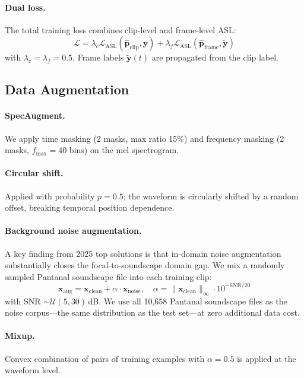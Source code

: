 \documentclass[10pt,twocolumn]{article}
\newcommand{\vx}{\mathbf{x}}
\begin{document}
\paragraph{Dual loss.}
The total training loss combines clip-level and frame-level ASL:
\begin{equation}
  \mathcal{L} = \lambda_c \mathcal{L}_\text{ASL}(\hat{\bm{p}}_\text{clip}, \bm{y})
              + \lambda_f \mathcal{L}_\text{ASL}(\hat{\bm{p}}_\text{frame}, \tilde{\bm{y}})
  \label{eq:dual}
\end{equation}
with $\lambda_c = \lambda_f = 0.5$.
Frame labels $\tilde{\bm{y}}(t)$ are propagated from the clip label.

\subsection{Data Augmentation}
\label{sec:aug}

\paragraph{SpecAugment.}
We apply time masking (2 masks, max ratio 15\%) and frequency masking (2 masks,
$f_\text{max}=40$ bins) on the mel spectrogram.

\paragraph{Circular shift.}
Applied with probability $p=0.5$; the waveform is circularly shifted by a random
offset, breaking temporal position dependence.

\paragraph{Background noise augmentation.}
A key finding from 2025 top solutions is that in-domain noise augmentation
substantially closes the focal-to-soundscape domain gap.
We mix a randomly sampled Pantanal soundscape file into each training clip:
\begin{equation}
  \vx_\text{aug} = \vx_\text{clean} + \alpha \cdot \vx_\text{noise}, \quad
  \alpha = \|\vx_\text{clean}\|_\infty \cdot 10^{-\text{SNR}/20}
  \label{eq:bgnoise}
\end{equation}
with SNR $\sim \mathcal{U}(5, 30)$\,dB.
We use all 10,658 Pantanal soundscape files as the noise corpus—the same
distribution as the test set—at zero additional data cost.

\paragraph{Mixup.}
Convex combination of pairs of training examples with $\alpha=0.5$
is applied at the waveform level.
\end{document}
